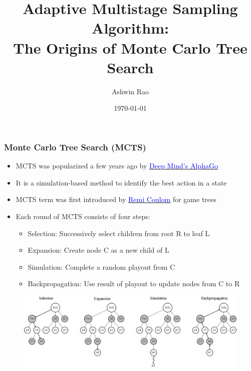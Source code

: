\documentclass[handout]{beamer}
\title[Adaptive Multistage Sampling]{Adaptive Multistage Sampling Algorithm: \\ The Origins of Monte Carlo Tree Search} %
\author{Ashwin Rao} %
\institute[Stanford] %
{
ICME, Stanford University
}
\date{\today} %
\begin{document}
\begin{frame}
\titlepage %
\end{frame}

\begin{frame}
\frametitle{Monte Carlo Tree Search (MCTS)}
\pause
\begin{itemize}[<+->]
\item MCTS was popularized a few years ago by \href{https://www.nature.com/articles/nature16961}{\underline{\textcolor{blue}{Deep Mind's AlphaGo}}}
\item It is a simulation-based method to identify the best action in a state
\item MCTS term was first introduced by \href{https://hal.inria.fr/inria-00116992/document}{\underline{\textcolor{blue}{Remi Coulom}}} for game trees
\item Each round of MCTS consists of four steps:
\begin{itemize}
\item Selection: Successively select children from root R to leaf L
\item Expansion: Create node C as a new child of L
\item Simulation: Complete a random playout from C
\item Backpropagation: Use result of playout to update nodes from C to R
\end{itemize}
\end{itemize}
\begin{figure}
\includegraphics[scale=0.115]{MCTS.png}
\end{figure}
\end{frame}
\end{document}
